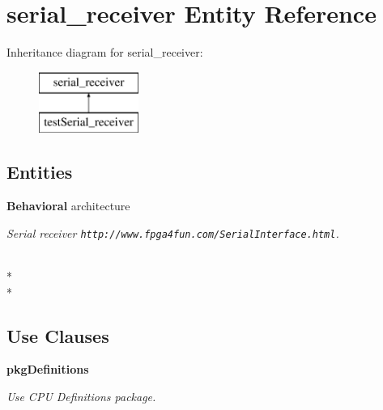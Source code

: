 \section{serial\-\_\-receiver Entity Reference}
\label{classserial__receiver}
Inheritance diagram for serial\-\_\-receiver\-:\begin{figure}[H]
\begin{center}
\leavevmode
\includegraphics[height=2.000000cm]{classserial__receiver}
\end{center}
\end{figure}
\subsection*{Entities}
\begin{DoxyCompactItemize}
\item 
{\bf Behavioral} architecture
\begin{DoxyCompactList}\small\item\em Serial receiver {\tt http\-://www.\-fpga4fun.\-com/\-Serial\-Interface.\-html}. \end{DoxyCompactList}\end{DoxyCompactItemize}
\\*
\\*
\subsection*{Use Clauses}
 \begin{DoxyCompactItemize}
\item 
{\bf pkg\-Definitions}   \label{classserial__receiver_ac442dca664056131bdaf5c92e4351e01}

\begin{DoxyCompactList}\small\item\em Use C\-P\-U Definitions package. \end{DoxyCompactList}\end{DoxyCompactItemize}
